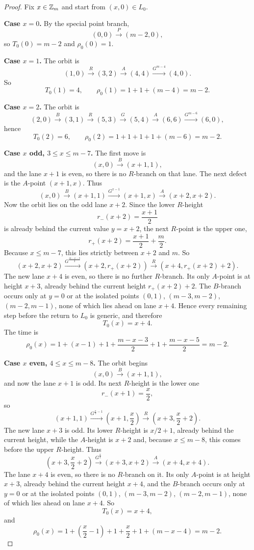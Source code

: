 \begin{proof}
Fix $x\in \mathbb Z_m$ and start from $(x,0)\in L_0$.

\smallskip
\noindent\textbf{Case $x=0$.}
By the special point branch,
\[
(0,0)\xrightarrow{P}(m-2,0),
\]
so $T_0(0)=m-2$ and $\rho_0(0)=1$.

\smallskip
\noindent\textbf{Case $x=1$.}
The orbit is
\[
(1,0)\xrightarrow{R}(3,2)\xrightarrow{A}(4,4)\xrightarrow{G^{m-4}}(4,0).
\]
So
\[
T_0(1)=4,\qquad \rho_0(1)=1+1+(m-4)=m-2.
\]

\smallskip
\noindent\textbf{Case $x=2$.}
The orbit is
\[
(2,0)\xrightarrow{B}(3,1)\xrightarrow{R}(5,3)\xrightarrow{G}(5,4)\xrightarrow{A}(6,6)
\xrightarrow{G^{m-6}}(6,0),
\]
hence
\[
T_0(2)=6,\qquad \rho_0(2)=1+1+1+1+(m-6)=m-2.
\]

\smallskip
\noindent\textbf{Case $x$ odd, $3\le x\le m-7$.}
The first move is
\[
(x,0)\xrightarrow{B}(x+1,1),
\]
and the lane $x+1$ is even, so there is no $R$-branch on that lane.
The next defect is the $A$-point $(x+1,x)$.
Thus
\[
(x,0)\xrightarrow{B}(x+1,1)\xrightarrow{G^{x-1}}(x+1,x)\xrightarrow{A}(x+2,x+2).
\]
Now the orbit lies on the odd lane $x+2$.
Since the lower $R$-height
\[
r_-(x+2)=\frac{x+1}{2}
\]
is already behind the current value $y=x+2$, the next $R$-point is the upper one,
\[
r_+(x+2)=\frac{x+1}{2}+\frac m2.
\]
Because $x\le m-7$, this lies strictly between $x+2$ and $m$.
So
\[
(x+2,x+2)\xrightarrow{G^{\frac{m-x-3}{2}}}\left(x+2,r_+(x+2)\right)\xrightarrow{R}\left(x+4,r_+(x+2)+2\right).
\]
The new lane $x+4$ is even, so there is no further $R$-branch.
Its only $A$-point is at height $x+3$, already behind the current height $r_+(x+2)+2$.
The $B$-branch occurs only at $y=0$ or at the isolated points $(0,1)$, $(m-3,m-2)$, $(m-2,m-1)$, none of
which lies ahead on lane $x+4$.
Hence every remaining step before the return to $L_0$ is generic, and therefore
\[
T_0(x)=x+4.
\]
The time is
\[
\rho_0(x)
=
1+(x-1)+1+\frac{m-x-3}{2}+1+\frac{m-x-5}{2}
=
m-2.
\]

\smallskip
\noindent\textbf{Case $x$ even, $4\le x\le m-8$.}
The orbit begins
\[
(x,0)\xrightarrow{B}(x+1,1),
\]
and now the lane $x+1$ is odd.
Its next $R$-height is the lower one
\[
r_-(x+1)=\frac{x}{2},
\]
so
\[
(x+1,1)\xrightarrow{G^{\frac{x}{2}-1}}\left(x+1,\frac{x}{2}\right)\xrightarrow{R}\left(x+3,\frac{x}{2}+2\right).
\]
The new lane $x+3$ is odd.
Its lower $R$-height is $x/2+1$, already behind the current height, while the $A$-height is $x+2$ and,
because $x\le m-8$, this comes before the upper $R$-height.
Thus
\[
\left(x+3,\frac{x}{2}+2\right)\xrightarrow{G^{\frac{x}{2}}}(x+3,x+2)\xrightarrow{A}(x+4,x+4).
\]
The lane $x+4$ is even, so there is no $R$-branch on it.
Its only $A$-point is at height $x+3$, already behind the current height $x+4$, and the $B$-branch occurs
only at $y=0$ or at the isolated points $(0,1)$, $(m-3,m-2)$, $(m-2,m-1)$, none of which lies ahead on
lane $x+4$.
So
\[
T_0(x)=x+4,
\]
and
\[
\rho_0(x)
=
1+\left(\frac{x}{2}-1\right)+1+\frac{x}{2}+1+(m-x-4)
=
m-2.
\]


\end{proof}
